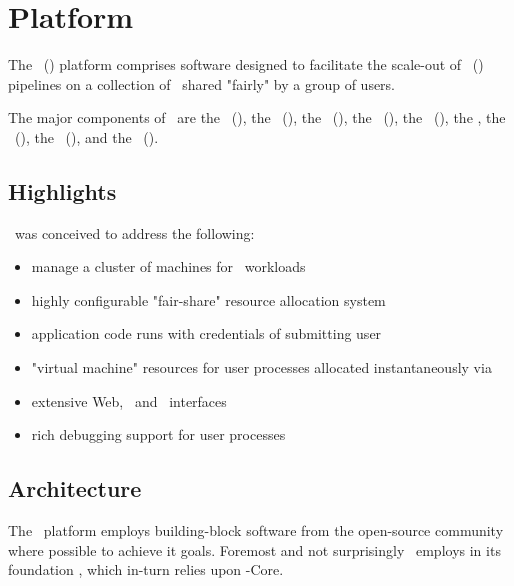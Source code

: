 



\chapter{Platform}

    The \varDistributedUIMAClusterComputing~(\varDUCC) platform comprises software 
    designed to facilitate the scale-out of 
    \varUnstructuredInformationManagementArchitecture~(\varUIMA) pipelines on a 
    collection of \varNodesMachinesComputers~shared "fairly" by a group of users.
    
    The major components of \varDUCC~are the \varOrchestrator~(\varOR), the \varJobDriver~(\varJD), 
    the \varResourceManager~(\varRM), the \varProcessManager~(\varPM), the \varServicesManager~(\varSM), 
    the \varAgents, the \varCommandLineInterface~(\varCLI), the \varApplicationProgramInterface~(\varAPI), 
    and the \varWebServer~(\varWS).
        
    \section{Highlights}
    
    \varDUCC~was conceived to address the following:
    
    \begin{itemize}
      \item manage a cluster of machines for \varUIMA~workloads
      \item highly configurable "fair-share" resource allocation system
      \item application code runs with credentials of submitting user
      \item "virtual machine" resources for user processes allocated instantaneously via \varLinuxControlGroups
      \item extensive Web, \varCLI~and \varAPI~interfaces
      \item rich debugging support for user processes
    \end{itemize} 
    
    \section{Architecture}
    
    The \varDUCC~platform employs building-block software from the open-source community
    where possible to achieve it goals. Foremost and not surprisingly \varDUCC~employs in
    its foundation \varUIMAAS, which in-turn relies upon \varUIMA-Core.
    
